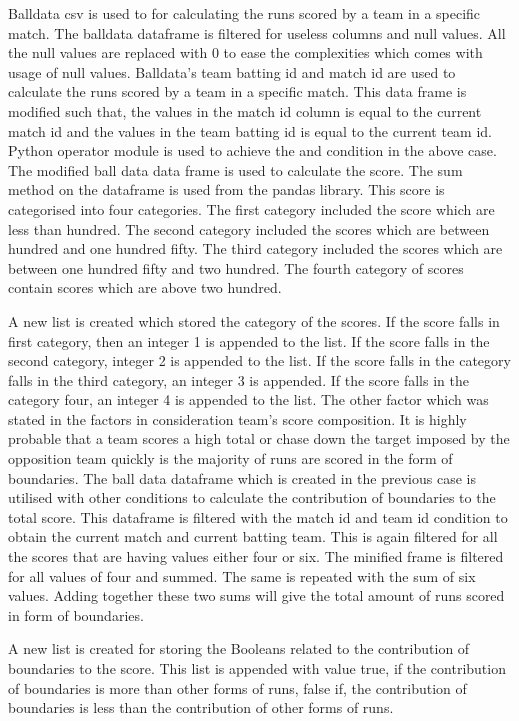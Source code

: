 \documentclass[sigconf]{acmart}
\begin{document}
Balldata csv is used to for calculating the runs scored by a team in a specific match. The balldata dataframe is filtered for useless columns and null values. All the null values are replaced with 0 to ease the complexities which comes with usage of null values. Balldata’s team batting id and match id are used to calculate the runs scored by a team in a specific match. This data frame is modified such that, the values in the match id column is equal to the current match id and the values in the team batting id is equal to the current team id. Python operator module is used to achieve the and condition in the above case. 
The modified ball data data frame is used to calculate the score. The sum method on the dataframe is used from the pandas library. This score is categorised into four categories. The first category included the score which are less than hundred. The second category included the scores which are between hundred and one hundred fifty. The third category included the scores which are between one hundred fifty and two hundred. The fourth category of scores contain scores which are above two hundred. 


A new list is created which stored the category of the scores. If the score falls in first category, then an integer 1 is appended to the list. If the score falls in the second category, integer 2 is appended to the list. If the score falls in the category falls in the third category, an integer 3 is appended. If the score falls in the category four, an integer 4 is appended to the list.
The other factor which was stated in the factors in consideration team’s score composition. It is highly probable that a team scores a high total or chase down the target imposed by the opposition team quickly is the majority of runs are scored in the form of boundaries. The ball data dataframe which is created in the previous case is utilised with other conditions to calculate the contribution of boundaries to the total score. This dataframe is filtered with the match id and team id condition to obtain the current match and current batting team. This is again filtered for all the scores that are having values either four or six. The minified frame is filtered for all values of four and summed. The same is repeated with the sum of six values. Adding together these two sums will give the total amount of runs scored in form of boundaries.

A new list is created for storing the Booleans related to the contribution of boundaries to the score. This list is appended with value true, if the contribution of boundaries is more than other forms of runs, false if, the contribution of boundaries is less than the contribution of other forms of runs.
\end{document}
